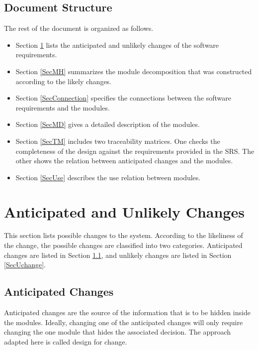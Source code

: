 \documentclass[12pt, titlepage]{article}
\begin{document}
\subsection{Document Structure}
The rest of the document is organized as follows. 
\begin{itemize}
    \item Section \ref{SecChange} lists the anticipated and unlikely changes of the software requirements.
    \item Section \ref{SecMH} summarizes the module decomposition that was constructed according to the likely changes.
    \item Section \ref{SecConnection} specifies the connections between the software requirements and the modules.
    \item Section \ref{SecMD} gives a detailed description of the modules.
    \item Section \ref{SecTM} includes two traceability matrices. One checks the completeness of the design against the requirements provided in the SRS. The other shows the relation between anticipated changes and the modules.
    \item Section \ref{SecUse} describes the use relation between modules.
\end{itemize}


\section{Anticipated and Unlikely Changes} \label{SecChange}

This section lists possible changes to the system. According to the likeliness
of the change, the possible changes are classified into two
categories. Anticipated changes are listed in Section \ref{SecAchange}, and
unlikely changes are listed in Section \ref{SecUchange}.

\subsection{Anticipated Changes} \label{SecAchange}

Anticipated changes are the source of the information that is to be hidden
inside the modules. Ideally, changing one of the anticipated changes will only
require changing the one module that hides the associated decision. The approach
adapted here is called design for change.
\end{document}
